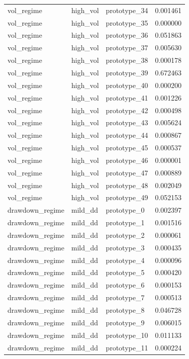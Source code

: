 \begin{tabular}{lllr}
vol\_regime & high\_vol & prototype\_34 & 0.001461 \\
vol\_regime & high\_vol & prototype\_35 & 0.000000 \\
vol\_regime & high\_vol & prototype\_36 & 0.051863 \\
vol\_regime & high\_vol & prototype\_37 & 0.005630 \\
vol\_regime & high\_vol & prototype\_38 & 0.000178 \\
vol\_regime & high\_vol & prototype\_39 & 0.672463 \\
vol\_regime & high\_vol & prototype\_40 & 0.000200 \\
vol\_regime & high\_vol & prototype\_41 & 0.001226 \\
vol\_regime & high\_vol & prototype\_42 & 0.000498 \\
vol\_regime & high\_vol & prototype\_43 & 0.005624 \\
vol\_regime & high\_vol & prototype\_44 & 0.000867 \\
vol\_regime & high\_vol & prototype\_45 & 0.000537 \\
vol\_regime & high\_vol & prototype\_46 & 0.000001 \\
vol\_regime & high\_vol & prototype\_47 & 0.000889 \\
vol\_regime & high\_vol & prototype\_48 & 0.002049 \\
vol\_regime & high\_vol & prototype\_49 & 0.052153 \\
drawdown\_regime & mild\_dd & prototype\_0 & 0.002397 \\
drawdown\_regime & mild\_dd & prototype\_1 & 0.001516 \\
drawdown\_regime & mild\_dd & prototype\_2 & 0.000061 \\
drawdown\_regime & mild\_dd & prototype\_3 & 0.000435 \\
drawdown\_regime & mild\_dd & prototype\_4 & 0.000096 \\
drawdown\_regime & mild\_dd & prototype\_5 & 0.000420 \\
drawdown\_regime & mild\_dd & prototype\_6 & 0.000153 \\
drawdown\_regime & mild\_dd & prototype\_7 & 0.000513 \\
drawdown\_regime & mild\_dd & prototype\_8 & 0.046728 \\
drawdown\_regime & mild\_dd & prototype\_9 & 0.006015 \\
drawdown\_regime & mild\_dd & prototype\_10 & 0.011133 \\
drawdown\_regime & mild\_dd & prototype\_11 & 0.000224 \\

\end{tabular}
